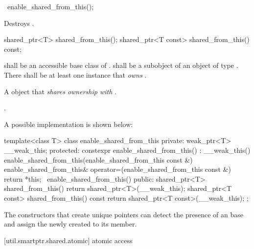 \begin{itemdecl}
~enable_shared_from_this();
\end{itemdecl}

\begin{itemdescr}
\pnum\effects  Destroys .
\end{itemdescr}

%
%
%
\begin{itemdecl}
shared_ptr<T>       shared_from_this();
shared_ptr<T const> shared_from_this() const;
\end{itemdecl}

\begin{itemdescr}
\pnum\requires  {} shall be an accessible base
class of .  shall be a subobject of an object  of
type . There shall be at least one  instance 
that \textit{owns} .

\pnum\returns  A  object 
that \textit{shares ownership with} .

\pnum\postconditions  {}.
\end{itemdescr}

\pnum
\enternote A possible implementation is shown below:
\begin{codeblock}
template<class T> class enable_shared_from_this {
private:
  weak_ptr<T> __weak_this;
protected:
  constexpr enable_shared_from_this() : __weak_this() { }
  enable_shared_from_this(enable_shared_from_this const &) { }
  enable_shared_from_this& operator=(enable_shared_from_this const &) { return *this; }
  ~enable_shared_from_this() { }
public:
  shared_ptr<T> shared_from_this() { return shared_ptr<T>(__weak_this); }
  shared_ptr<T const> shared_from_this() const { return shared_ptr<T const>(__weak_this); }
};
\end{codeblock}

\pnum
The  constructors that create unique pointers
can detect the presence of an  base and
assign the newly created  to its 
member. \exitnote

[util.smartptr.shared.atomic]{ atomic access}

